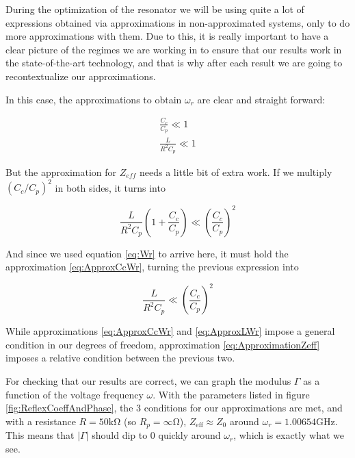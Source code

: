 \documentclass[../main.tex]{subfiles}
\begin{document}
During the optimization of the resonator we will be using quite a lot of
expressions obtained via approximations in non-approximated systems, only to do
more approximations with them. Due to this, it is really important to have a
clear picture of the regimes we are working in to ensure that our results work
in the state-of-the-art technology, and that is why after each result we are
going to recontextualize our approximations.

In this case, the approximations to obtain \(\omega_{r}\) are clear and
straight forward:

\begin{gather}
    \frac{C_{c}}{C_{p}} \ll 1 \label{eq:ApproxCcWr}\\
    \frac{L}{R^2 C_{p}} \ll 1 \label{eq:ApproxLWr}
\end{gather}

But the approximation for \(Z_{eff}\) needs a little bit of extra work. If we
multiply \((C_{c} / C_{p})^2\) in both sides, it turns into

\begin{equation}
\label{eq:ProtoZeffCond}
    \frac{L}{R^2 C_{p}} \left(1 + \frac{C_{c}}{C_{p}}\right) \ll
    \left(\frac{C_{c}}{C_{p}}\right)^2
\end{equation}

And since we used equation \ref{eq:Wr} to arrive here, it must hold
the approximation \ref{eq:ApproxCcWr}, turning the previous expression into

\begin{equation}
\label{eq:ApproximationZeff}
    \frac{L}{R^2 C_{p}} \ll \left(\frac{C_{c}}{C_{p}}\right)^2
\end{equation}

While approximations \ref{eq:ApproxCcWr} and \ref{eq:ApproxLWr} impose a
general condition in our degrees of freedom, approximation
\ref{eq:ApproximationZeff} imposes a relative condition between
the previous two.

For checking that our results are correct, we can graph the modulus \(\Gamma\)
as a function of the voltage frequency \(\omega\). With the parameters
listed in figure \ref{fig:ReflexCoeffAndPhase}, the 3 conditions for our
approximations are met, and with a resistance \(R = 50\unit{\kilo\ohm}\)
(so \(R_{p} = \infty\unit{\ohm}\)),
\(Z_{\text{eff}} \approx Z_{0}\) around \(\omega_{r} = 1.00654 \unit{\giga\hertz}\).
This means that \(|\Gamma|\) should dip to 0 quickly around \(\omega_{r}\),
which is exactly what we see.
\end{document}

